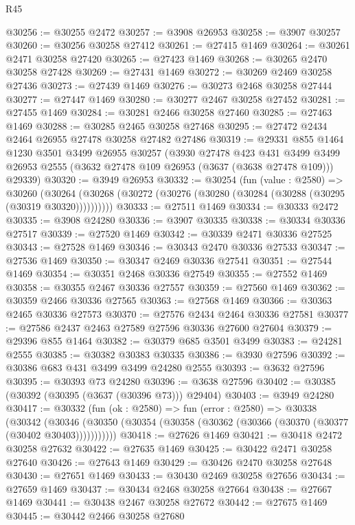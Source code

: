 \begin{lexlean}{R45}
\begin{coremodule}
@30256 := @30255 @2472
@30257 := @3908 @26953
@30258 := @3907 @30257
@30260 := @30256 @30258 @27412
@30261 := @27415 @1469
@30264 := @30261 @2471 @30258 @27420
@30265 := @27423 @1469
@30268 := @30265 @2470 @30258 @27428
@30269 := @27431 @1469
@30272 := @30269 @2469 @30258 @27436
@30273 := @27439 @1469
@30276 := @30273 @2468 @30258 @27444
@30277 := @27447 @1469
@30280 := @30277 @2467 @30258 @27452
@30281 := @27455 @1469
@30284 := @30281 @2466 @30258 @27460
@30285 := @27463 @1469
@30288 := @30285 @2465 @30258 @27468
@30295 := @27472 @2434 @2464 @26955 @27478 @30258 @27482 @27486
@30319 := @29331
    @855
    @1464
    @1230
    @3501
    @3499
    @26955
    @30257
    (@3930
      @27478
      @423
      @431
      @3499
      @3499
      @26953
      @2555
      (@3632 @27478 @109 @26953 (@3637 (@3638 @27478 @109)))
      @29339)
@30320 := @3949 @26953
@30332 := @30254
    (fun (value : @2580) =>
    @30260 (@30264 (@30268 (@30272 (@30276 (@30280 (@30284 (@30288 (@30295 (@30319 @30320))))))))))
@30333 := @27511 @1469
@30334 := @30333 @2472
@30335 := @3908 @24280
@30336 := @3907 @30335
@30338 := @30334 @30336 @27517
@30339 := @27520 @1469
@30342 := @30339 @2471 @30336 @27525
@30343 := @27528 @1469
@30346 := @30343 @2470 @30336 @27533
@30347 := @27536 @1469
@30350 := @30347 @2469 @30336 @27541
@30351 := @27544 @1469
@30354 := @30351 @2468 @30336 @27549
@30355 := @27552 @1469
@30358 := @30355 @2467 @30336 @27557
@30359 := @27560 @1469
@30362 := @30359 @2466 @30336 @27565
@30363 := @27568 @1469
@30366 := @30363 @2465 @30336 @27573
@30370 := @27576 @2434 @2464 @30336 @27581
@30377 := @27586 @2437 @2463 @27589 @27596 @30336 @27600 @27604
@30379 := @29396 @855 @1464
@30382 := @30379 @685 @3501 @3499
@30383 := @24281 @2555
@30385 := @30382 @30383 @30335
@30386 := @3930 @27596
@30392 := @30386 @683 @431 @3499 @3499 @24280 @2555
@30393 := @3632 @27596
@30395 := @30393 @73 @24280
@30396 := @3638 @27596
@30402 := @30385 (@30392 (@30395 (@3637 (@30396 @73))) @29404)
@30403 := @3949 @24280
@30417 := @30332
    (fun (ok : @2580) =>
    fun (error : @2580) =>
    @30338
      (@30342
        (@30346 (@30350 (@30354 (@30358 (@30362 (@30366 (@30370 (@30377 (@30402 @30403)))))))))))
@30418 := @27626 @1469
@30421 := @30418 @2472 @30258 @27632
@30422 := @27635 @1469
@30425 := @30422 @2471 @30258 @27640
@30426 := @27643 @1469
@30429 := @30426 @2470 @30258 @27648
@30430 := @27651 @1469
@30433 := @30430 @2469 @30258 @27656
@30434 := @27659 @1469
@30437 := @30434 @2468 @30258 @27664
@30438 := @27667 @1469
@30441 := @30438 @2467 @30258 @27672
@30442 := @27675 @1469
@30445 := @30442 @2466 @30258 @27680

\end{coremodule}
\end{lexlean}
